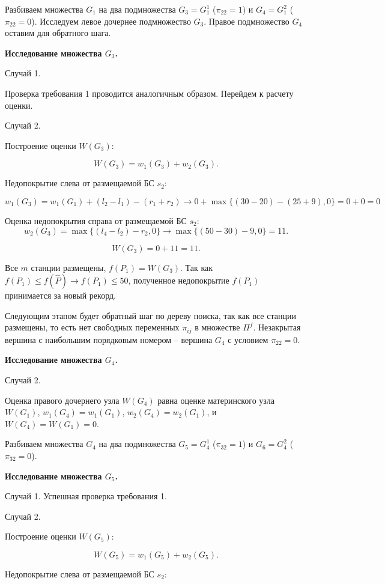 Разбиваем множества $G_1$ на два подмножества $G_3 = G^1_1$ ($\pi_{22} = 1$) и $G_4 = G^2_1$ ($\pi_{22} = 0$). Исследуем  левое дочернее подмножество $G_3$. Правое подмножество $G_4$ оставим для обратного шага.

\textbf{Исследование множества $G_3$.}

Случай 1.

Проверка требования 1 проводится аналогичным образом. Перейдем к расчету оценки.

Случай 2.

Построение оценки $W(G_3)$:

$$
W(G_3) = w_1(G_3) + w_2(G_3).
$$

Недопокрытие слева от размещаемой БС $s_2$:

$$
w_1(G_3) =  w_1(G_1) + (l_2 - l_1) - (r_1 + r_2) \rightarrow 0 + \max\{(30 - 20) - (25+ 9), 0\} = 0 + 0 = 0
$$

Оценка недопокрытия справа от размещаемой БС $s_2$: 
$$
w_2(G_3) = \max\{(l_4 - l_2) - r_2, 0\} \rightarrow \max\{(50 - 30) - 9, 0\} = 11.
$$

$$
W(G_3) = 0 + 11 = 11.
$$

Все $m$ станции размещены, $f(P_1) = W(G_3)$. Так как $f(P_1) \leqslant f(\widehat{P}) \rightarrow f(P_1) \leqslant 50$, полученное недопокрытие $f(P_1)$ принимается за новый рекорд.

Следующим этапом будет обратный шаг по дереву поиска, так как все станции размещены, то есть нет свободных переменных $\pi_{ij}$ в множестве $\Pi^f$. Незакрытая вершина с наибольшим порядковым номером -- вершина $G_4$ с условием $\pi_{22}=0$.

\textbf{Исследование множества $G_4$.}


Случай 2.

Оценка правого дочернего узла $W(G_4)$ равна оценке материнского узла $W(G_1)$, $w_1(G_4)=w_1(G_1)$, $w_2(G_4) = w_2(G_1)$, и $W(G_4) = W(G_1) = 0$.


Разбиваем множества $G_4$ на два подмножества $G_5 = G^1_4$ ($\pi_{32} = 1$) и $G_6 = G^2_4$ ($\pi_{32} = 0$).

\textbf{Исследование множества $G_5$.}

Случай 1. Успешная проверка требования 1.


Случай 2.

Построение оценки $W(G_5)$:

$$
W(G_5) = w_1(G_5) + w_2(G_5).
$$

Недопокрытие слева от размещаемой БС $s_2$:

